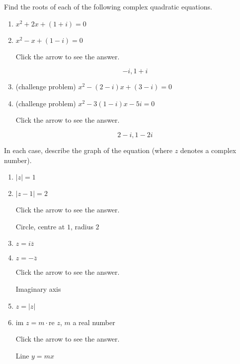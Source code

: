 \documentclass{ximera}
\begin{document}
\begin{problem}\label{prb:A.11}
Find the roots of each of the following complex quadratic equations.

\begin{enumerate}
\item $x^{2} + 2x + (1 + i) = 0$
\item  $x^{2} - x + (1 - i) = 0$

Click the arrow to see the answer.
\begin{expandable}{}{}
$$-i, 1 + i$$
\end{expandable}

\item (challenge problem) $x^{2} - (2 - i)x + (3 - i) = 0$
\item (challenge problem) $x^{2} - 3(1 - i)x - 5i = 0$

Click the arrow to see the answer.
\begin{expandable}{}{}
$$2 - i, 1 - 2i$$
\end{expandable}
\end{enumerate}
\end{problem}

\begin{problem}\label{prb:A.12}
In each case, describe the graph of the equation (where $z$ denotes a complex number).

\begin{enumerate}
\item $|z| = 1$
\item $|z - 1| = 2$

Click the arrow to see the answer.
\begin{expandable}{}{}
Circle, centre at $1$, radius $2$
\end{expandable}

\item $z = i \overline{z}$
\item $z = -\overline{z}$

Click the arrow to see the answer.
\begin{expandable}{}{}
Imaginary axis
\end{expandable}

\item $z = |z|$
\item $\mbox{im }z = m \cdot \mbox{re }z$, $m$ a real number

Click the arrow to see the answer.
\begin{expandable}{}{}
 Line $y = mx$
\end{expandable}

\end{enumerate}
\end{problem}
\end{document}
